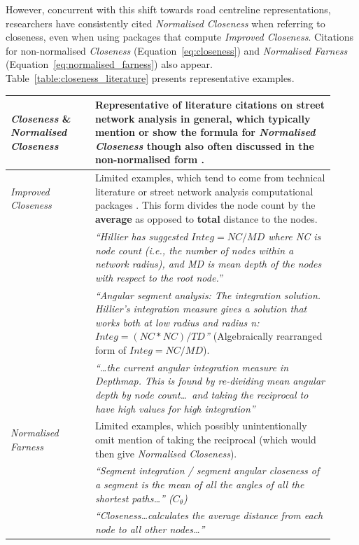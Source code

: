 However, concurrent with this shift towards road centreline representations, researchers have consistently cited \emph{Normalised Closeness} when referring to closeness, even when using packages that compute \emph{Improved Closeness}. Citations for non-normalised \emph{Closeness} (Equation~\ref{eq:closeness}) and \emph{Normalised Farness} (Equation~\ref{eq:normalised_farness}) also appear. Table~\ref{table:closeness_literature} presents representative examples.

\begin{table}[htbp]
  \centering

  \begin{tabular}{p{0.24\linewidth} p{0.68\linewidth}}
    \toprule
    \emph{Closeness} \& \emph{Normalised Closeness} & Representative of literature citations on street network analysis in general, which typically mention or show the formula for \emph{Normalised Closeness} \cite{crucitti_centrality_2006, Porta2009, Masucci2016, vaughan_glossary_2015, Turner2007, noauthor_segment_nodate, Porta2006, Omer2018} though also often discussed in the non-normalised form \cite{hutchison_network_2005, Sevtsuk2012, Cooper2015, Batty2013}. \\

    \midrule
    \emph{Improved Closeness} & Limited examples, which tend to come from technical literature or street network analysis computational packages \cite{turner_depthmapx_2020, stahle_place_2023, simons_cityseer_2023}. This form divides the node count by the \textbf{average} as opposed to \textbf{total} distance to the nodes. \\
    & \emph{``Hillier has suggested $Integ = NC / MD$ where NC is node count (i.e., the number of nodes within a network radius), and MD is mean depth of the nodes with respect to the root node.'' \cite{turner_getting_2008}} \\
    & \emph{``Angular segment analysis: The integration solution. Hillier's integration measure gives a solution that works both at low radius and radius n: $Integ = (NC * NC) / TD$'' \cite{turner_getting_2008}} (Algebraically rearranged form of $Integ = NC / MD$). \\
    & \emph{``\ldots the current angular integration measure in Depthmap. This is found by re-dividing mean angular depth by node count\ldots\ and taking the reciprocal to have high values for high integration'' \cite{Hillier2012}} \\

    \midrule
    \emph{Normalised Farness} & Limited examples, which possibly unintentionally omit mention of taking the reciprocal (which would then give \emph{Normalised Closeness}). \\
    & \emph{``Segment integration / segment angular closeness of a segment is the mean of all the angles of all the shortest paths\ldots'' ($C_\theta$) \cite{rashid_geometry_2017, van_nes_introduction_2021}} \\
    & \emph{``Closeness\ldots calculates the average distance from each node to all other nodes\ldots'' \cite{Gil2017}} \\
    \bottomrule
  \end{tabular}


\end{table}
